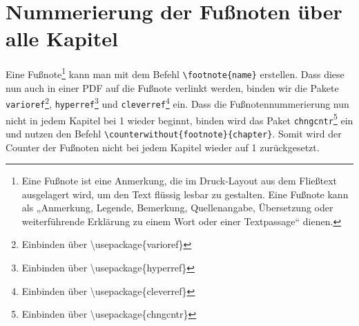 \documentclass[
12pt,
ngerman
]{scrreprt}
\begin{document}
\section{Nummerierung der Fußnoten über alle Kapitel}
\label{sec:footnotes}
Eine Fußnote\footnote{Eine Fußnote ist eine Anmerkung, die im Druck-Layout aus dem Fließtext ausgelagert wird, um den Text flüssig lesbar zu gestalten. Eine Fußnote kann als „Anmerkung, Legende, Bemerkung, Quellenangabe, Übersetzung oder weiterführende Erklärung zu einem Wort oder einer Textpassage“ dienen.} kann man mit dem Befehl \verb!\footnote{name}! erstellen. Dass diese nun auch in einer PDF auf die Fußnote verlinkt werden, binden wir die Pakete \verb!varioref!\footnote{Einbinden über \textbackslash usepackage\{varioref\}}, \verb!hyperref!\footnote{Einbinden über \textbackslash usepackage\{hyperref\}} und \verb!cleverref!\footnote{Einbinden über \textbackslash usepackage\{cleverref\}} ein. Dass die Fußnotennummerierung nun nicht in jedem Kapitel bei 1 wieder beginnt, binden wird das Paket \verb!chngcntr!\footnote{Einbinden über \textbackslash usepackage\{chngcntr\}} ein und nutzen den Befehl \verb!\counterwithout{footnote}{chapter}!. Somit wird der Counter der Fußnoten nicht bei jedem Kapitel wieder auf 1 zurückgesetzt.
\end{document}
